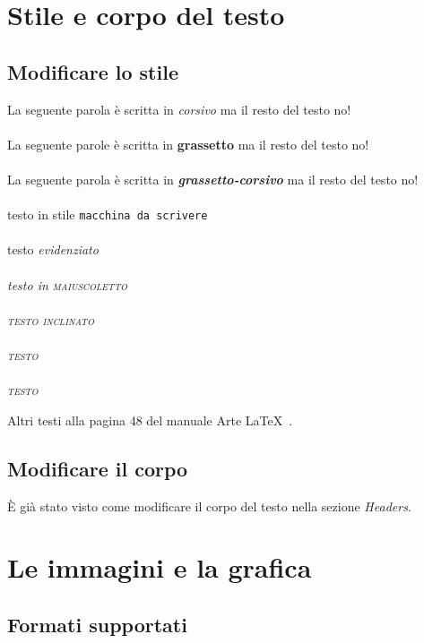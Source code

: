 \documentclass[a4paper]{article}
\begin{document}
\newpage

\section{Stile e corpo del testo}

\subsection{Modificare lo stile}

La seguente parola è scritta in \textit{corsivo} ma il resto del testo no! %
\\\\
La seguente parole è scritta in \textbf{grassetto} ma il resto del testo no! %
\\\\
La seguente parola è scritta in \textit{\textbf{grassetto-corsivo}} ma il resto del testo no! %
\\\\
testo in stile \texttt{macchina da scrivere}
\\\\
testo \em{evidenziato}
\\\\
testo in \scshape{maiuscoletto}
\\\\
testo \slshape{inclinato}
\\\\
testo 
\\\\
testo 

Altri testi alla pagina 48 del manuale Arte \LaTeX\ .

\subsection{Modificare il corpo}

È già stato visto come modificare il corpo del testo nella sezione \textit{Headers}.

\vspace{3cm}

\section{Le immagini e la grafica}

\subsection{Formati supportati}
\end{document}
